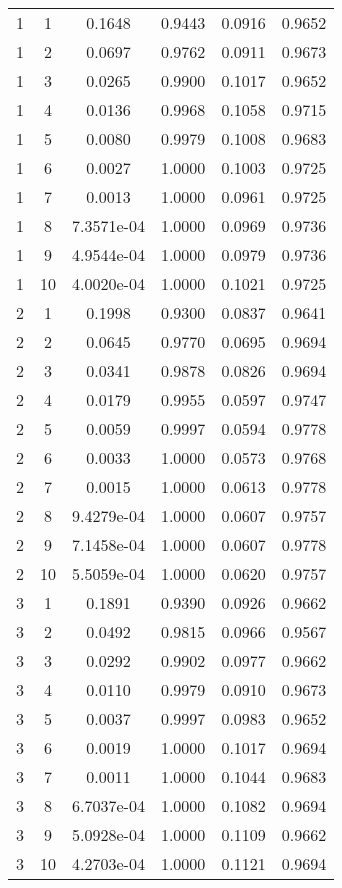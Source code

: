 \begin{center}
\begin{longtable}{|c|c|c|c|c|c|}
1 & 1 & 0.1648 & 0.9443 & 0.0916 & 0.9652 \\
1 & 2 & 0.0697 & 0.9762 & 0.0911 & 0.9673 \\
1 & 3 & 0.0265 & 0.9900 & 0.1017 & 0.9652 \\
1 & 4 & 0.0136 & 0.9968 & 0.1058 & 0.9715 \\
1 & 5 & 0.0080 & 0.9979 & 0.1008 & 0.9683 \\
1 & 6 & 0.0027 & 1.0000 & 0.1003 & 0.9725 \\
1 & 7 & 0.0013 & 1.0000 & 0.0961 & 0.9725 \\
1 & 8 & 7.3571e-04 & 1.0000 & 0.0969 & 0.9736 \\
1 & 9 & 4.9544e-04 & 1.0000 & 0.0979 & 0.9736 \\
1 & 10 & 4.0020e-04 & 1.0000 & 0.1021 & 0.9725 \\
\hline
2 & 1 & 0.1998 & 0.9300 & 0.0837 & 0.9641 \\
2 & 2 & 0.0645 & 0.9770 & 0.0695 & 0.9694 \\
2 & 3 & 0.0341 & 0.9878 & 0.0826 & 0.9694 \\
2 & 4 & 0.0179 & 0.9955 & 0.0597 & 0.9747 \\
2 & 5 & 0.0059 & 0.9997 & 0.0594 & 0.9778 \\
2 & 6 & 0.0033 & 1.0000 & 0.0573 & 0.9768 \\
2 & 7 & 0.0015 & 1.0000 & 0.0613 & 0.9778 \\
2 & 8 & 9.4279e-04 & 1.0000 & 0.0607 & 0.9757 \\
2 & 9 & 7.1458e-04 & 1.0000 & 0.0607 & 0.9778 \\
2 & 10 & 5.5059e-04 & 1.0000 & 0.0620 & 0.9757 \\
\hline
3 & 1 & 0.1891 & 0.9390 & 0.0926 & 0.9662 \\
3 & 2 & 0.0492 & 0.9815 & 0.0966 & 0.9567 \\
3 & 3 & 0.0292 & 0.9902 & 0.0977 & 0.9662 \\
3 & 4 & 0.0110 & 0.9979 & 0.0910 & 0.9673 \\
3 & 5 & 0.0037 & 0.9997 & 0.0983 & 0.9652 \\
3 & 6 & 0.0019 & 1.0000 & 0.1017 & 0.9694 \\
3 & 7 & 0.0011 & 1.0000 & 0.1044 & 0.9683 \\
3 & 8 & 6.7037e-04 & 1.0000 & 0.1082 & 0.9694 \\
3 & 9 & 5.0928e-04 & 1.0000 & 0.1109 & 0.9662 \\
3 & 10 & 4.2703e-04 & 1.0000 & 0.1121 & 0.9694 \\

\end{longtable}
\end{center}
